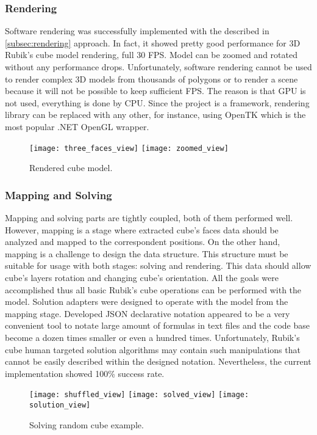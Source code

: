 \documentclass[../../main.tex]{subfiles}
\begin{document}
\subsubsection*{Rendering}

Software rendering was successfully implemented with the described in \ref{subsec:rendering} approach. In fact, it showed pretty good performance for 3D Rubik's cube model rendering, full 30 \ac{FPS}. Model can be zoomed and rotated without any performance drops. Unfortunately, software rendering cannot be used to render complex 3D models from thousands of polygons or to render a scene because it will not be possible to keep sufficient FPS. The reason is that \ac{GPU} is not used, everything is done by \ac{CPU}. Since the project is a framework, rendering library can be replaced with any other, for instance, using \ac{OpenTK} which is the most popular .NET \ac{OpenGL} wrapper. 

\begin{figure} [ht!]
    \begin{center}
        \texttt{[image: three\_faces\_view]}
        \texttt{[image: zoomed\_view]}
        \caption{Rendered cube model.}
        \label{fig:rendered_cube_view}
    \end{center}
\end{figure}

\subsubsection*{Mapping and Solving}

Mapping and solving parts are tightly coupled, both of them performed well. However, mapping is a stage where extracted cube's faces data should be analyzed and mapped to the correspondent positions. On the other hand, mapping is a challenge to design the data structure. This structure must be suitable for usage with both stages: solving and rendering. This data should allow cube's layers rotation and changing cube's orientation. All the goals were accomplished thus all basic Rubik's cube operations can be performed with the model.
Solution adapters were designed to operate with the model from the mapping stage. Developed \ac{JSON} declarative notation appeared to be a very convenient tool to notate large amount of formulas in text files and the code base become a dozen times smaller or even a hundred times. Unfortunately, Rubik's cube human targeted solution algorithms may contain such manipulations that cannot be easily described within the designed notation. Nevertheless, the current implementation showed 100\% success rate.

\begin{figure} [ht!]
    \begin{center}
        \texttt{[image: shuffled\_view]}
        \texttt{[image: solved\_view]}
         \texttt{[image: solution\_view]}
        \caption{Solving random cube example.}
        \label{fig:solving_cube_view}
    \end{center}
\end{figure}
\end{document}
